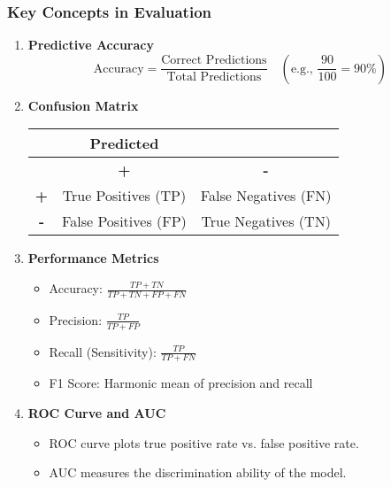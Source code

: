 \documentclass[aspectratio=169]{beamer}
\begin{document}
\begin{frame}[fragile]
    \frametitle{Key Concepts in Evaluation}
    \begin{enumerate}
        \item \textbf{Predictive Accuracy}
            \begin{equation}
            \text{Accuracy} = \frac{\text{Correct Predictions}}{\text{Total Predictions}} \quad (\text{e.g., } \frac{90}{100} = 90\%)
            \end{equation}
        
        \item \textbf{Confusion Matrix}
            \begin{center}
            \begin{tabular}{|c|c|c|}
                \hline
                & \textbf{Predicted} & \\
                \hline
                & \textbf{+} & \textbf{-} \\
                \hline
                \textbf{+} & True Positives (TP) & False Negatives (FN) \\
                \hline
                \textbf{-} & False Positives (FP) & True Negatives (TN) \\
                \hline
            \end{tabular}
            \end{center}
        
        \item \textbf{Performance Metrics}
            \begin{itemize}
                \item Accuracy: \( \frac{TP + TN}{TP + TN + FP + FN} \)
                \item Precision: \( \frac{TP}{TP + FP} \)
                \item Recall (Sensitivity): \( \frac{TP}{TP + FN} \)
                \item F1 Score: Harmonic mean of precision and recall
            \end{itemize}
        
        \item \textbf{ROC Curve and AUC}
            \begin{itemize}
                \item ROC curve plots true positive rate vs. false positive rate.
                \item AUC measures the discrimination ability of the model.
            \end{itemize}
    \end{enumerate}
\end{frame}
\end{document}
